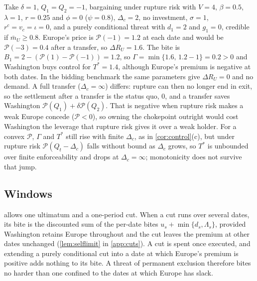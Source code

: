 Take $\delta=1$, $Q_1=Q_2=-1$, bargaining under rupture risk with $V=4$, $\beta=0.5$, $\lambda=1$, $r=0.25$ and $\phi=0$ ($\psi=0.8$), $\Delta_c=2$, no investment, $\sigma=1$, $r^c=v_c=\iota=0$, and a purely conditional threat with $d_1=2$ and $g_1=0$, credible if $\bar m_U\ge 0.8$. Europe's price is $\mathcal P(-1)=1.2$ at each date and would be $\mathcal P(-3)=0.4$ after a transfer, so $\Delta R_U=1.6$. The bite is $B_1=2-(\mathcal P(1)-\mathcal P(-1))=1.2$, so $\Gamma=\min\{1.6,\,1.2-1\}=0.2>0$ and Washington buys control for $T^*=1.4$, although Europe's premium is negative at both dates. In the bidding benchmark the same parameters give $\Delta R_U=0$ and no demand. A full transfer ($\Delta_c=\infty$) differs: rupture can then no longer end in exit, so the settlement after a transfer is the status quo, $0$, and a transfer saves Washington $\mathcal P(Q_1)+\delta\mathcal P(Q_2)$. That is negative when rupture risk makes a weak Europe concede ($\mathcal P<0$), so owning the chokepoint outright would cost Washington the leverage that rupture risk gives it over a weak holder. For a convex $\mathcal P$, $\Gamma$ and $T^*$ still rise with finite $\Delta_c$, as in \cref{cor:control}(c), but under rupture risk $\mathcal P(Q_t-\Delta_c)$ falls without bound as $\Delta_c$ grows, so $T^*$ is unbounded over finite enforceability and drops at $\Delta_c=\infty$; monotonicity does not survive that jump.

\subsection{Windows}\label{sec:windows}

 allows one ultimatum and a one-period cut. When a cut runs over several dates, its bite is the discounted sum of the per-date bites $u_s+\min\{d_s,\Lambda_s\}$, provided Washington retains Europe throughout and the cut leaves the premium at other dates unchanged (\cref{lem:selflimit} in \cref{app:cuts}). A cut is spent once executed, and extending a purely conditional cut into a date at which Europe's premium is positive adds nothing to its bite. A threat of permanent exclusion therefore bites no harder than one confined to the dates at which Europe has slack.

